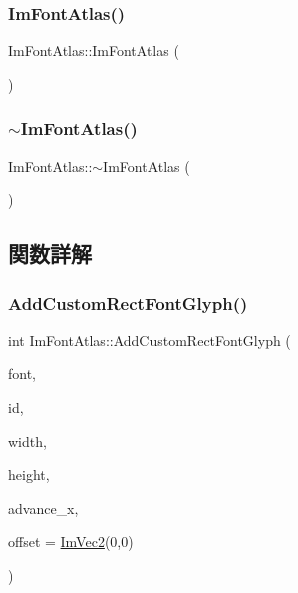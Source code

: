 \subsubsection{\texorpdfstring{Im\+Font\+Atlas()}{ImFontAtlas()}}
{\footnotesize\ttfamily Im\+Font\+Atlas\+::\+Im\+Font\+Atlas (\begin{DoxyParamCaption}{ }\end{DoxyParamCaption})}

\mbox{\label{struct_im_font_atlas_a950b4f7586ad7786ae251b957d67a268}} 
\subsubsection{\texorpdfstring{$\sim$\+Im\+Font\+Atlas()}{~ImFontAtlas()}}
{\footnotesize\ttfamily Im\+Font\+Atlas\+::$\sim$\+Im\+Font\+Atlas (\begin{DoxyParamCaption}{ }\end{DoxyParamCaption})}



\subsection{関数詳解}
\mbox{\label{struct_im_font_atlas_a5643182be4e3f1a442cfa6cdc0321c7c}} 
\subsubsection{\texorpdfstring{Add\+Custom\+Rect\+Font\+Glyph()}{AddCustomRectFontGlyph()}}
{\footnotesize\ttfamily int Im\+Font\+Atlas\+::\+Add\+Custom\+Rect\+Font\+Glyph (\begin{DoxyParamCaption}\item[{\mbox{\hyperlink{struct_im_font}{Im\+Font}} $\ast$}]{font,  }\item[{\mbox{\hyperlink{imgui_8h_af2c7badaf05a0008e15ef76d40875e97}{Im\+Wchar}}}]{id,  }\item[{int}]{width,  }\item[{int}]{height,  }\item[{float}]{advance\+\_\+x,  }\item[{const \mbox{\hyperlink{struct_im_vec2}{Im\+Vec2}} \&}]{offset = {\ttfamily \mbox{\hyperlink{struct_im_vec2}{Im\+Vec2}}(0,0)} }\end{DoxyParamCaption})}

